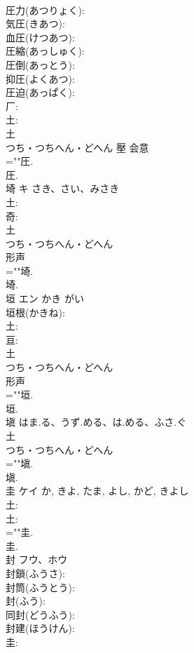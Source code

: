 \documentclass[8pt]{extreport}
\begin{document}
\begin{CJK}{UTF8}{min}
\\	圧力(あつりょく): 
\\	気圧(きあつ): 
\\	血圧(けつあつ): 
\\	圧縮(あっしゅく): 
\\	圧倒(あっとう): 
\\	抑圧(よくあつ): 
\\	圧迫(あっぱく): 
\\	厂: 
\\	土: 
\\	土	
\\	つち・つちへん・どへん	壓	会意 
\\	=""圧.
\\	圧.
\\	埼	キ	さき、さい、みさき		
\\	土: 
\\	奇: 
\\	土	
\\	つち・つちへん・どへん	
\\	形声 
\\	=""埼.
\\	埼.
\\	垣	エン	かき	がい	
\\	垣根(かきね): 
\\	土: 
\\	亘: 
\\	土	
\\	つち・つちへん・どへん	
\\	形声 
\\	=""垣.
\\	垣.
\\	塡		はま.る、うず.める、は.める、ふさ.ぐ		
\\	土	
\\	つち・つちへん・どへん	
\\	=""塡.
\\	塡.
\\	圭	ケイ		か, きよ, たま, よし, かど, きよし	
\\	土: 
\\	土: 
\\	=""圭.
\\	圭.
\\	封	フウ、ホウ			
\\	封鎖(ふうさ): 
\\	封筒(ふうとう): 
\\	封(ふう): 
\\	同封(どうふう): 
\\	封建(ほうけん): 
\\	圭: 

\end{CJK}
\end{document}
